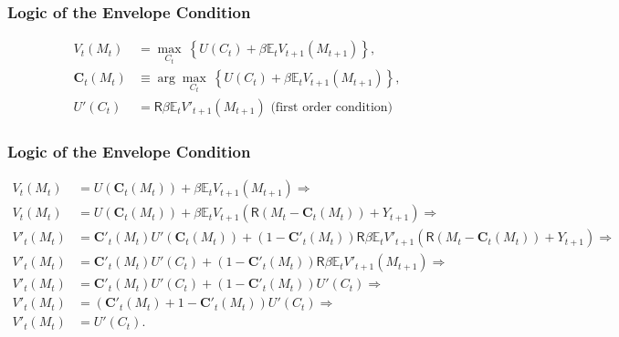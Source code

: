 \documentclass[aspectratio=169]{beamer}
\newcommand{\E}{\mathbb{E}}
\begin{document}

\begin{frame}
\frametitle{Logic of the Envelope Condition}

\begin{align*}
V_t(M_t) &= \max_{C_t} ~ \left\{ U(C_t) + \beta \E_t V_{t+1}(M_{t+1}) \right\}, \\
\mathbf{C}_t(M_t) &\equiv \arg\max_{C_t} ~ \left\{ U(C_t) + \beta \E_t V_{t+1}(M_{t+1}) \right\}, \\
U'(C_t) &= \mathsf{R} \beta \E_t V'_{t+1}(M_{t+1}) \text{~(first order condition)}
\end{align*}
\end{frame}


\begin{frame}
\frametitle{Logic of the Envelope Condition}

\begin{align*}
V_t(M_t) &= U(\mathbf{C}_t(M_t)) + \beta \E_t V_{t+1}(M_{t+1}) \Longrightarrow \\
V_t(M_t) &= U(\mathbf{C}_t(M_t)) + \beta \E_t V_{t+1}(\mathsf{R} (M_t - \mathbf{C}_t(M_t)) + Y_{t+1}) \Longrightarrow \\
V'_t(M_t) &= \mathbf{C}'_t(M_t) U'(\mathbf{C}_t(M_t)) + (1 - \mathbf{C}'_t(M_t))\mathsf{R} \beta \E_t V'_{t+1}(\mathsf{R} (M_t - \mathbf{C}_t(M_t)) + Y_{t+1}) \Longrightarrow \\
V'_t(M_t) &= \mathbf{C}'_t(M_t) U'(C_t) + (1 - \mathbf{C}'_t(M_t)) \mathsf{R} \beta \E_t V'_{t+1}(M_{t+1}) \Longrightarrow \\
V'_t(M_t) &= \mathbf{C}'_t(M_t) U'(C_t) + (1 - \mathbf{C}'_t(M_t)) U'(C_t) \Longrightarrow \\
V'_t(M_t) &= (\mathbf{C}'_t(M_t) + 1 - \mathbf{C}'_t(M_t)) U'(C_t) \Longrightarrow \\
V'_t(M_t) &= U'(C_t).
\end{align*}
\end{frame}
\end{document}
